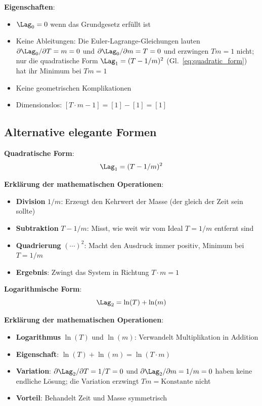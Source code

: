 	\textbf{Eigenschaften}:
	\begin{itemize}
		\item $\Lag_0 = 0$ wenn das Grundgesetz erfüllt ist
		\item Keine Ableitungen: Die Euler-Lagrange-Gleichungen lauten $\partial\Lag_0/\partial T = m = 0$ und $\partial\Lag_0/\partial m = T = 0$ und erzwingen $T m = 1$ nicht; nur die quadratische Form $\Lag_1 = (T - 1/m)^2$ (Gl.~\eqref{eq:quadratic_form}) hat ihr Minimum bei $T m = 1$
		\item Keine geometrischen Komplikationen
		\item Dimensionslos: $[T \cdot m - 1] = [1] - [1] = [1]$
	\end{itemize}
	
	\subsection{Alternative elegante Formen}
	
	\textbf{Quadratische Form}:
	\begin{equation}
		\Lag_1 = (T - 1/m)^2
		\label{eq:quadratic_form}
	\end{equation}
	
	\textbf{Erklärung der mathematischen Operationen}:
	\begin{itemize}
		\item \textbf{Division} $1/m$: Erzeugt den Kehrwert der Masse (der gleich der Zeit sein sollte)
		\item \textbf{Subtraktion} $T - 1/m$: Misst, wie weit wir vom Ideal $T = 1/m$ entfernt sind
		\item \textbf{Quadrierung} $(\cdots)^2$: Macht den Ausdruck immer positiv, Minimum bei $T = 1/m$
		\item \textbf{Ergebnis}: Zwingt das System in Richtung $T \cdot m = 1$
	\end{itemize}
	
	\textbf{Logarithmische Form}:
	\begin{equation}
		\Lag_2 = \ln(T) + \ln(m)
		\label{eq:logarithmic_form}
	\end{equation}
	
	\textbf{Erklärung der mathematischen Operationen}:
	\begin{itemize}
		\item \textbf{Logarithmus} $\ln(T)$ und $\ln(m)$: Verwandelt Multiplikation in Addition
		\item \textbf{Eigenschaft}: $\ln(T) + \ln(m) = \ln(T \cdot m)$
		\item \textbf{Variation}: $\partial\Lag_2/\partial T = 1/T = 0$ und $\partial\Lag_2/\partial m = 1/m = 0$ haben keine endliche Lösung; die Variation erzwingt $T m = \text{Konstante}$ nicht
		\item \textbf{Vorteil}: Behandelt Zeit und Masse symmetrisch
	\end{itemize}
	
